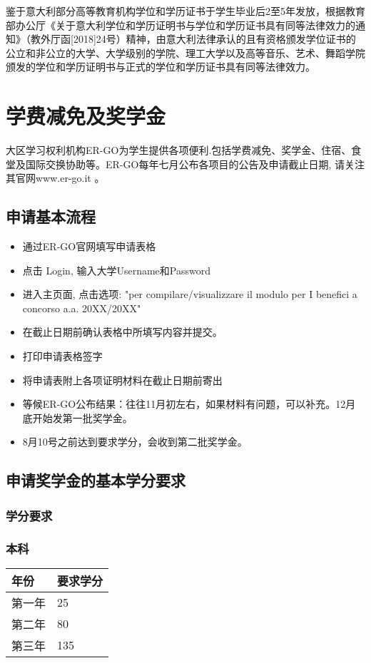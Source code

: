 鉴于意大利部分高等教育机构学位和学历证书于学生毕业后2至5年发放，根据教育部办公厅《关于意大利学位和学历证明书与学位和学历证书具有同等法律效力的通知》（教外厅函[2018]24号）精神，由意大利法律承认的且有资格颁发学位证书的公立和非公立的大学、大学级别的学院、理工大学以及高等音乐、艺术、舞蹈学院颁发的学位和学历证明书与正式的学位和学历证书具有同等法律效力。



\section{学费减免及奖学金}

大区学习权利机构ER-GO为学生提供各项便利.包括学费减免、奖学金、住宿、食堂及国际交换协助等。ER-GO每年七月公布各项目的公告及申请截止日期, 请关注其官网www.er-go.it 。 

\subsection{申请基本流程}
\begin{itemize}
 \item 通过ER-GO官网填写申请表格
 \item 点击 Login, 输入大学Username和Password
 \item 进入主页面, 点击选项: "per compilare/visualizzare il modulo per I benefici a concorso a.a.
20XX/20XX"
 \item 在截止日期前确认表格中所填写内容并提交。
 \item 打印申请表格签字 
 \item 将申请表附上各项证明材料在截止日期前寄出 
 \item 等候ER-GO公布结果：往往11月初左右，如果材料有问题，可以补充。12月底开始发第一批奖学金。
 \item 8月10号之前达到要求学分，会收到第二批奖学金。
\end{itemize}

\subsection{申请奖学金的基本学分要求}

\subsubsection{学分要求}

\subsubsection{本科}
\begin{tabularx}{\textwidth}{ |X|X| }
  \hline
  年份 & 要求学分\\
  \hline 
  第一年  & 25  \\
  第二年  & 80  \\
  第三年  & 135  \\
  \hline
\end{tabularx}



